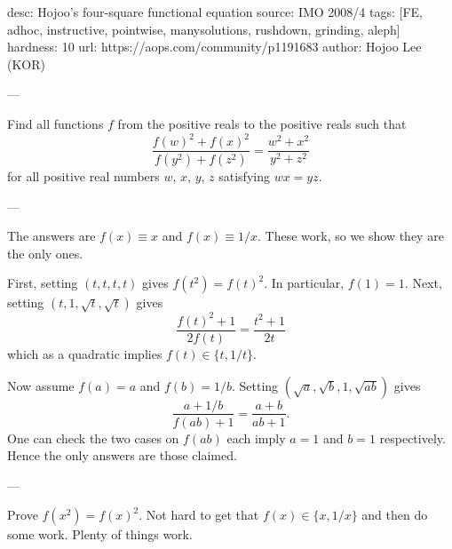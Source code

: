 desc:  Hojoo's four-square functional equation
source:  IMO 2008/4
tags:  [FE, adhoc, instructive, pointwise, manysolutions, rushdown, grinding, aleph]
hardness: 10
url: https://aops.com/community/p1191683
author: Hojoo Lee (KOR)

---

Find all functions $f$ from the positive reals to the positive reals such that
\[ \frac{f(w)^2 + f(x)^2}{f(y^2)+f(z^2)} = \frac{w^2+x^2}{y^2+z^2} \]
for all positive real numbers $w$, $x$, $y$, $z$ satisfying $wx=yz$.

---

The answers are $f(x) \equiv x$ and $f(x) \equiv 1/x$.
These work, so we show they are the only ones.

First, setting $(t,t,t,t)$ gives $f(t^2) = f(t)^2$.
In particular, $f(1) = 1$.
Next, setting $(t, 1, \sqrt t, \sqrt t)$ gives
\[ \frac{f(t)^2 + 1}{2f(t)} = \frac{t^2 + 1}{2t} \]
which as a quadratic implies $f(t) \in \{t, 1/t\}$.

Now assume $f(a) = a$ and $f(b) = 1/b$.
Setting $(\sqrt a, \sqrt b, 1, \sqrt{ab})$ gives
\[ \frac{a + 1/b}{f(ab) + 1} = \frac{a+b}{ab+1}. \]
One can check the two cases on $f(ab)$ each imply
$a=1$ and $b=1$ respectively.
Hence the only answers are those claimed.

---

Prove $f(x^2) = f(x)^2$. Not hard to get that $f(x) \in \{x, 1/x\}$ and then do some work.
Plenty of things work.
